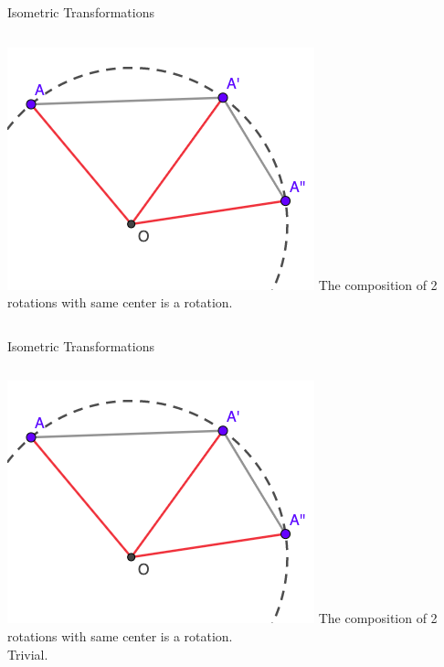 \documentclass{beamer}
\begin{document}
\begin{frame}{Isometric Transformations}
	\begin{columns}
		\includegraphics[scale=0.4]{iso16.png}
		The composition of 2 rotations with same center is a 
		rotation.
	\end{columns}
\end{frame}
\begin{frame}{Isometric Transformations}
	\begin{columns}
		\column{0.6\textwidth}
		\includegraphics[scale=0.4]{iso16.png}
		\column{0.4\textwidth}
		The composition of 2 rotations with same center is a 
		rotation.\\
		\phantom{Spacing}
		Trivial.
	\end{columns}
\end{frame}
\end{document}

